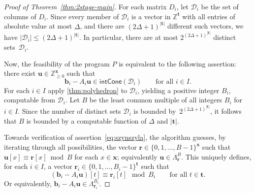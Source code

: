 \documentclass{article}
\renewcommand{\leq}{\leqslant}
\renewcommand{\geq}{\geqslant}
\newcommand{\Dd}{\mathcal{D}}
\newcommand{\Z}{\mathbb{Z}}
\newcommand{\Zn}{\Z_{\geq 0}}
\newcommand{\tup}[1]{{\mathbf{#1}}}
\newcommand{\xx}{\tup x}
\newcommand{\tv}{\tup t}
\newcommand{\bb}{\tup b}
\newcommand{\rr}{\tup r}
\newcommand{\uu}{\tup u}
\newcommand{\intcone}{\mathsf{intCone}}
\begin{document}
\begin{proof}[Proof of Theorem~\ref{thm:2stage-main}]
 For each matrix $D_i$, let $\Dd_i$ be the set of columns of $D_i$. Since every member of $\Dd_i$ is a vector in $\Z^\tv$ with all entries of absolute value at most $\Delta$, and there are $(2\Delta+1)^{|\tv|}$ different such vectors, we have $|\Dd_i|\leq (2\Delta+1)^{|\tv|}$. In particular, there are at most $2^{(2\Delta+1)^{|\tv|}}$ distinct sets~$\Dd_i$.

 Now, the feasibility of the program $P$ is equivalent to the following assertion: there exist $\uu\in \Zn^\xx$ such that
 \begin{equation}\label{eq:szynszyla}
   \bb_i-A_i\uu\in \intcone(\Dd_i)\qquad\textrm{for all }i\in I.
 \end{equation}
 For each $i\in I$ apply \cref{thm:polyhedron} to $\Dd_i$, yielding a positive integer $B_i$, computable from $\Dd_i$. Let $B$ be the least common multiple of all integers $B_i$ for $i\in I$. Since the number of distinct sets $\Dd_i$ is bounded by~$2^{(2\Delta+1)^{|\tv|}}$, it follows that $B$ is bounded by a computable function of $\Delta$ and $|\tv|$.

 Towards verification of assertion~\cref{eq:szynszyla}, the algorithm guesses, by iterating through all possibilities, the vector $\rr\in \{0,1,\ldots,B-1\}^{\xx}$ such that $\uu[x]\equiv \rr[x]\bmod B$ for each $x\in \xx$; equivalently $\uu\in \Lambda_\rr^B$. This uniquely defines, for each $i\in I$, a vector $\rr_i\in \{0,1,\ldots,B_i-1\}^{\tv}$ such that
 $$(\bb_i-A_i\uu)[t]\equiv \rr_i[t]\mod B_i\qquad\textrm{for all }t\in \tv.$$
 Or equivalently, $\bb_i-A_i\uu\in \Lambda^{B_i}_{\rr_i}$.


\end{proof}
\end{document}
